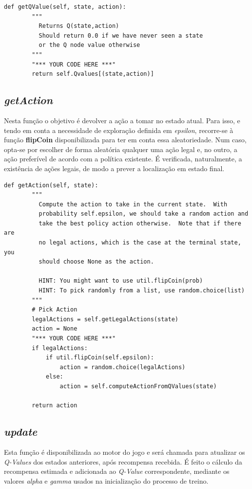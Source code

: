 \documentclass[runningheads]{article}
\begin{document}
\begin{verbatim}
def getQValue(self, state, action):
        """
          Returns Q(state,action)
          Should return 0.0 if we have never seen a state
          or the Q node value otherwise
        """
        "*** YOUR CODE HERE ***"
        return self.Qvalues[(state,action)]
\end{verbatim}

\subsection{\textit{getAction}}
Nesta função o objetivo é devolver a ação a tomar no estado atual. Para isso, e tendo em conta a necessidade de exploração definida em \textit{epsilon}, recorre-se à função \textbf{flipCoin} disponibilizada para ter em conta essa aleatoriedade. Num caso, opta-se por escolher de forma aleatória qualquer uma ação legal e, no outro, a ação preferível de acordo com a política existente. É verificada, naturalmente, a existência de ações legais, de modo a prever a localização em estado final.

\begin{verbatim}
def getAction(self, state):
        """
          Compute the action to take in the current state.  With
          probability self.epsilon, we should take a random action and
          take the best policy action otherwise.  Note that if there are
          no legal actions, which is the case at the terminal state, you
          should choose None as the action.

          HINT: You might want to use util.flipCoin(prob)
          HINT: To pick randomly from a list, use random.choice(list)
        """
        # Pick Action
        legalActions = self.getLegalActions(state)
        action = None
        "*** YOUR CODE HERE ***"
        if legalActions:
            if util.flipCoin(self.epsilon):
                action = random.choice(legalActions)
            else:
                action = self.computeActionFromQValues(state)

        return action
\end{verbatim}

\newpage
\subsection{\textit{update}}
Esta função é disponibilizada ao motor do jogo e será chamada para atualizar os \textit{Q-Values} dos estados anteriores, após recompensa recebida. É feito o cálculo da recompensa estimada e adicionada ao \textit{Q-Value} correspondente, mediante os valores \textit{alpha} e \textit{gamma} usados na inicialização do processo de treino.
\end{document}
